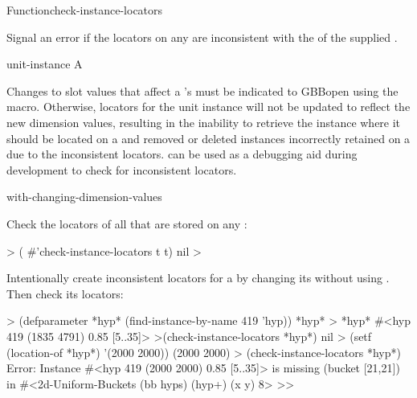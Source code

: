 \documentclass[10pt,twoside,english,pdftex]{article}
\begin{document}
\begin{functiondoc}{Function}{check-instance-locators}{%
    }

\fnsyntax

\fnpurpose Signal an error if the locators on any  are
inconsistent with the  of the supplied
.

\fnpackage {}

\fnmodule {}

\fnargs
\begin{args}{unit-instance}
 A 
\end{args}

\fndescription
%
Changes to slot values that affect a 's
 must be indicated to GBBopen using the
 macro.  Otherwise,
locators for the unit instance will not be updated to reflect the new
dimension values, resulting in the inability to retrieve the instance where it
should be located on a  and removed or deleted instances
incorrectly retained on a  due to the inconsistent
locators.   can be used as a debugging
aid during development to check for inconsistent locators.

\begin{alsos}{with-changing-dimension-values}
\end{alsos}

\fnexamples
%
% 
Check the locators of all  that are stored on any
:
% 
\W\supp
\begin{example}
  > ( #'check-instance-locators t t)
  nil
  >
\end{example}
%
% 
Intentionally create inconsistent locators for a 
 by changing its  without using
.  Then check its
locators:
% 
\W\supp\notpretop
\begin{example}
  > (defparameter *hyp* (find-instance-by-name 419 'hyp))
  *hyp*
  > *hyp*
  #<hyp 419 (1835 4791) 0.85 [5..35]>
  >(check-instance-locators *hyp*)
  nil
  > (setf (location-of *hyp*) '(2000 2000))
  (2000 2000)
  > (check-instance-locators *hyp*)
  Error: Instance #<hyp 419 (2000 2000) 0.85 [5..35]> is missing (bucket [21,21]) 
         in #<2d-Uniform-Buckets (bb hyps) (hyp+) (x y) 8>
  >>
\end{example}

\end{functiondoc}
\end{document}
